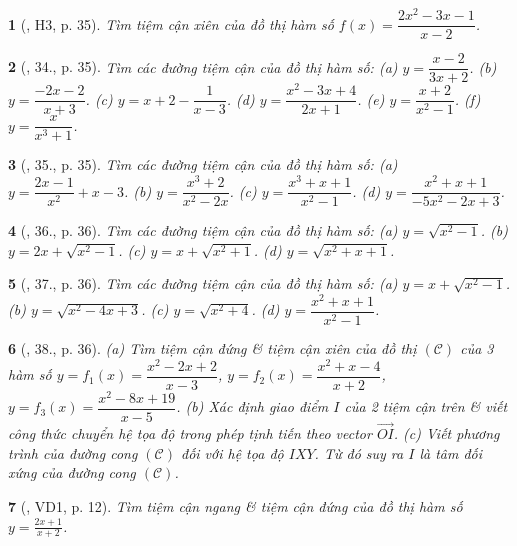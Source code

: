 \documentclass{article}
\newtheorem{baitoan}{}
\begin{document}
\begin{baitoan}[\cite{SGK_Toan_12_giai_tich_nang_cao}, H3, p. 35]
	Tìm tiệm cận xiên của đồ thị hàm số $f(x) = \dfrac{2x^2 - 3x - 1}{x - 2}$.
\end{baitoan}

\begin{baitoan}[\cite{SGK_Toan_12_giai_tich_nang_cao}, 34., p. 35]
	Tìm các đường tiệm cận của đồ thị hàm số: (a) $y = \dfrac{x - 2}{3x + 2}$. (b) $y = \dfrac{-2x - 2}{x + 3}$. (c) $y = x + 2 - \dfrac{1}{x - 3}$. (d) $y = \dfrac{x^2 - 3x + 4}{2x + 1}$. (e) $y = \dfrac{x + 2}{x^2 - 1}$. (f) $y = \dfrac{x}{x^3 + 1}$.
\end{baitoan}

\begin{baitoan}[\cite{SGK_Toan_12_giai_tich_nang_cao}, 35., p. 35]
	Tìm các đường tiệm cận của đồ thị hàm số: (a) $y = \dfrac{2x - 1}{x^2} + x - 3$. (b) $y = \dfrac{x^3 + 2}{x^2 - 2x}$. (c) $y = \dfrac{x^3 + x + 1}{x^2 - 1}$. (d) $y = \dfrac{x^2 + x + 1}{-5x^2 - 2x + 3}$.
\end{baitoan}

\begin{baitoan}[\cite{SGK_Toan_12_giai_tich_nang_cao}, 36., p. 36]
	Tìm các đường tiệm cận của đồ thị hàm số: (a) $y = \sqrt{x^2 - 1}$. (b) $y = 2x + \sqrt{x^2 - 1}$. (c) $y = x + \sqrt{x^2 + 1}$. (d) $y = \sqrt{x^2 + x + 1}$.
\end{baitoan}

\begin{baitoan}[\cite{SGK_Toan_12_giai_tich_nang_cao}, 37., p. 36]
	Tìm các đường tiệm cận của đồ thị hàm số: (a) $y = x + \sqrt{x^2 - 1}$. (b) $y = \sqrt{x^2 - 4x + 3}$. (c) $y = \sqrt{x^2 + 4}$. (d) $y = \dfrac{x^2 + x + 1}{x^2 - 1}$.
\end{baitoan}

\begin{baitoan}[\cite{SGK_Toan_12_giai_tich_nang_cao}, 38., p. 36]
	(a) Tìm tiệm cận đứng \& tiệm cận xiên của đồ thị $(\mathcal{C})$ của 3 hàm số $y = f_1(x) = \dfrac{x^2 - 2x + 2}{x - 3}$, $y = f_2(x) = \dfrac{x^2 + x - 4}{x + 2}$, $y = f_3(x) = \dfrac{x^2 - 8x + 19}{x - 5}$. (b) Xác định giao điểm $I$ của 2 tiệm cận trên \& viết công thức chuyển hệ tọa độ trong phép tịnh tiến theo vector $\overrightarrow{OI}$. (c) Viết phương trình của đường cong $(\mathcal{C})$ đối với hệ tọa độ $IXY$. Từ đó suy ra $I$ là tâm đối xứng của đường cong $(\mathcal{C})$.
\end{baitoan}

\begin{baitoan}[\cite{TLCT_giai_tich_12}, VD1, p. 12]
	Tìm tiệm cận ngang \& tiệm cận đứng của đồ thị hàm số $y = \frac{2x + 1}{x + 2}$.
\end{baitoan}
\end{document}
